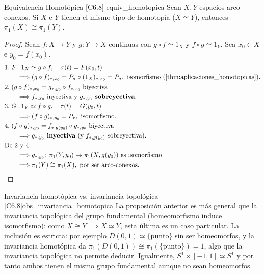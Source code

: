 \begin{proposicion}{Equivalencia Homotópica [C6.8] \marcaC}{equiv_homotopica}
Sean $X, Y$ espacios arco-conexos. Si $X$ e $Y$ tienen el mismo tipo de homotopía ($X \simeq Y$), entonces $\pi_1(X) \cong \pi_1(Y)$.

\begin{proof}
Sean $f \colon X \to Y$ y $g \colon Y \to X$ continuas con $g \circ f \simeq 1_X$ y $f \circ g \simeq 1_Y$. Sea $x_0 \in X$ e $y_0 = f(x_0)$.
\begin{align*}
    &1.\; F \colon 1_X \simeq g \circ f, \quad \sigma(t) = F(x_0,t) \\
    &\qquad \Longrightarrow (g \circ f)_{*,x_0} = P_\sigma \circ (1_X)_{*,x_0} = P_\sigma, \text{ isomorfismo (\cref{thm:aplicaciones_homotopicas}).} \\
    &2.\; (g \circ f)_{*,x_0} = g_{*,y_0} \circ f_{*,x_0} \text{ biyectiva} \\
    &\qquad \Longrightarrow f_{*,x_0} \text{ inyectiva y } g_{*,y_0} \textbf{ sobreyectiva}. \\
    &3.\; G \colon 1_Y \simeq f \circ g, \quad \tau(t) = G(y_0,t) \\
    &\qquad \Longrightarrow (f \circ g)_{*,y_0} = P_\tau, \text{ isomorfismo}. \\
    &4.\; (f \circ g)_{*,y_0} = f_{*,g(y_0)} \circ g_{*,y_0} \text{ biyectiva} \\
    &\qquad \Longrightarrow g_{*,y_0} \textbf{ inyectiva} \text{ (y } f_{*,g(y_0)} \text{ sobreyectiva)}. \\
    &\text{De 2 y 4:} \\
    &\qquad \Longrightarrow g_{*,y_0} \colon \pi_1(Y,y_0) \to \pi_1(X,g(y_0)) \text{ es isomorfismo} \\
    &\qquad \Longrightarrow \pi_1(Y) \cong \pi_1(X), \text{ por ser arco-conexos.}
\end{align*}
\end{proof}
\end{proposicion}


\begin{observacion}{Invariancia homotópica vs. invariancia topológica [C6.8]}{obs_invariancia_homotopica}
La proposición anterior es más general que la invariancia topológica del grupo fundamental (homeomorfismo induce isomorfismo): como $X \cong Y \implies X \simeq Y$, esta última es un caso particular. La inclusión es estricta: por ejemplo $D(0,1) \simeq \{\text{punto}\}$ sin ser homeomorfos, y la invariancia homotópica da $\pi_1(D(0,1)) \cong \pi_1(\{\text{punto}\}) = 1$, algo que la invariancia topológica no permite deducir. Igualmente, $S^1 \times [-1,1] \simeq S^1$ y por tanto ambos tienen el mismo grupo fundamental aunque no sean homeomorfos.
\end{observacion}